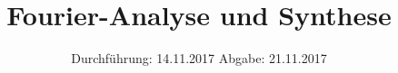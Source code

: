 

\subject{Versuch 351}
\title{Fourier-Analyse und Synthese}
\date{
  Durchführung: 14.11.2017
  \hspace{3em}
  Abgabe: 21.11.2017
}



\maketitle
\thispagestyle{empty}
\tableofcontents
\newpage







\printbibliography{}


